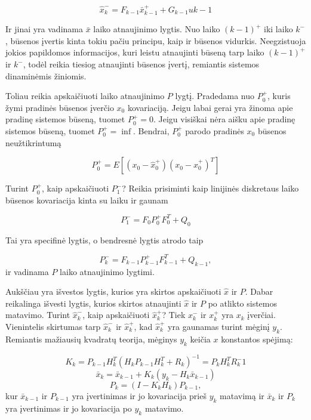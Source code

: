     \begin{equation}
        \hat{x}_k^- = F_{k-1}\bar{x}_{k-1}^+ + G_{k-1}u{k-1}
    \end{equation}

    Ir jinai yra vadinama $\bar{x}$ laiko atnaujinimo lygtis.
    Nuo laiko $(k-1)^+$ iki laiko $k^-$, būsenos įvertis kinta tokiu pačiu principu, kaip ir būsenos vidurkis.
    Neegzistuoja jokios papildomos informacijos, kuri leistu atnaujinti būseną tarp laiko $(k-1)^+$ ir $k^-$, todėl reikia tiesiog atnaujinti būsenos įvertį, remiantis sistemos dinaminėmis žiniomis.

    Toliau reikia apskaičiuoti laiko atnaujinimo $P$ lygtį.
    Pradedama nuo $P_0^+$, kuris žymi pradinės būsenos įverčio $x_0$ kovariaciją.
    Jeigu labai gerai yra žinoma apie pradinę sistemos būseną, tuomet $P_0^+ = 0$.
    Jeigu visiškai nėra aišku apie pradinę sistemos būseną, tuomet $P_0^+ = \inf$.
    Bendrai, $P_0^+$ parodo pradinės $x_0$ būsenos neužtikrintumą

    \begin{equation}
        P_0^+ = E[(x_0 - \hat{x}_0^+)(x_0 - \hat{x}_0^+)^T]
    \end{equation}

    Turint $P_0^+$, kaip apskaičiuoti $P_1^-$? Reikia prisiminti kaip linijinės diskretaus laiko būsenos kovariacija kinta su laiku ir gaunam

    \begin{equation}
        P_1^- = F_0 P_0^+F_0^T + Q_0
    \end{equation}

    Tai yra specifinė lygtis, o bendresnė lygtis atrodo taip

    \begin{equation}
        P_k^- = F_{k-1}P_{k-1}^+F_{k-1}^T + Q_{k-1},
    \end{equation}
    ir vadinama $P$ laiko atnaujinimo lygtimi.

    Aukščiau yra išvestos lygtis, kurios yra skirtos apskaičiuoti $\hat{x}$ ir $P$.
    Dabar reikalinga išvesti lygtis, kurios skirtos atnaujinti $\hat{x}$ ir $P$ po atlikto sistemos matavimo.
    Turint $\hat{x}_k^-$, kaip apskaičiuoti $\hat{x}_k^+$? Tiek $x_k^-$ ir $x_k^+$ yra $x_k$ įverčiai.
    Vienintelis skirtumas tarp $\hat{x}_k^-$ ir $\hat{x}_k^+$, kad $\hat{x}_k^+$ yra gaunamas turint mėginį $y_k$.
    Remiantis mažiausių kvadratų teorija, mėginys $y_k$ keičia $x$ konstantos spėjimą:

    \begin{equation}
        K_k = P_{k-1}H_k^T(H_kP_{k-1}H_k^T + R_k)^{-1} = P_kH_k^TR_k^-1
    \end{equation}
    \begin{equation}
        \bar{x}_k = \bar{x}_{k-1} + K_k(y_k - H_k\bar{x}_{k-1})
    \end{equation}
    \begin{equation}
        P_k = (I - K_kH_k)P_{k-1},
    \end{equation}
    kur $\bar{x}_{k-1}$ ir $P_{k-1}$ yra įvertinimas ir jo kovariacija prieš $y_k$ matavimą ir $\bar{x}_k$ ir $P_k$ yra įvertinimas ir jo kovariacija po $y_k$ matavimo.

